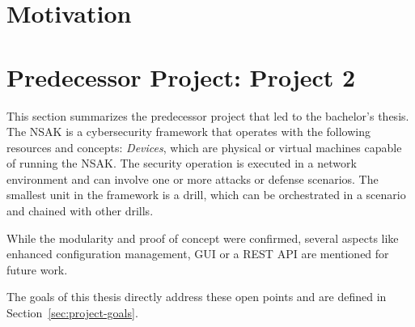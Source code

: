 
\section{Motivation}\label{sec:motivation}

\section{Predecessor Project: Project 2}\label{sec:predecessor-project-project-2}

This section summarizes the predecessor project that led to the bachelor's thesis.
The \gls{NSAK} is a cybersecurity framework that operates with the following resources and concepts:
\textit{Devices}, which are physical or virtual machines capable of running the \gls{NSAK}.
The security operation is executed in a network environment and can involve one or more attacks or defense scenarios.
The smallest unit in the framework is a drill, which can be orchestrated in a scenario and chained with other drills.


While the modularity and proof of concept were confirmed, several aspects like enhanced configuration management, \gls{GUI}
or a \gls{REST API} are mentioned for future work.


The goals of this thesis directly address these open points and are defined in Section~\ref{sec:project-goals}.

